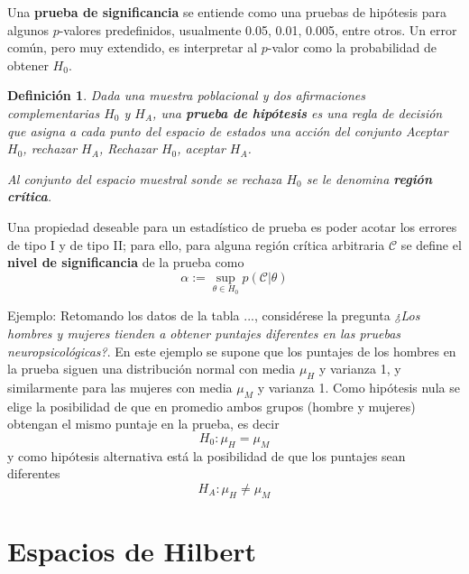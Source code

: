 \documentclass[12pt,letterpaper,draft]{book}
\newtheorem{definicion}{Definición}[chapter]
\begin{document}
Una \textbf{prueba de significancia} se entiende como una pruebas de hipótesis para algunos $p$-valores predefinidos, usualmente 0.05, 0.01, 0.005, entre otros.
%
Un error común, pero muy extendido, es interpretar al $p$-valor como la probabilidad de obtener $H_0$.

\begin{definicion}
Dada una muestra poblacional y dos afirmaciones complementarias $H_0$ y $H_A$, una \textbf{prueba de hipótesis} es una regla de decisión que asigna a cada punto del espacio de estados una acción del conjunto Aceptar $H_0$, rechazar $H_A$, Rechazar $H_0$, aceptar $H_A$.

Al conjunto del espacio muestral sonde se rechaza $H_0$ se le denomina \textbf{región crítica}. 
\end{definicion}

Una propiedad deseable para un estadístico de prueba es poder acotar los errores de tipo I y de tipo II; para ello, para alguna región crítica arbitraria $\mathcal{C}$ se define el \textbf{nivel de significancia} de la prueba como
\begin{equation}
\alpha := \sup_{\theta \in H_0} p(\mathcal{C} \lvert \theta)
\end{equation}

Ejemplo:
Retomando los datos de la tabla ..., considérese la pregunta \textit{¿Los hombres y mujeres tienden
a obtener puntajes diferentes en las pruebas neuropsicológicas?}. 
%
En este ejemplo se supone que los puntajes de los hombres en la prueba siguen una distribución normal con media $\mu_H$ y varianza 1, y similarmente para las mujeres con media $\mu_M$ y varianza 1.
%
Como hipótesis nula se elige la posibilidad de que en promedio ambos grupos (hombre y mujeres) obtengan el mismo puntaje en la prueba, es decir
\begin{equation}
H_0 : \mu_H = \mu_M
\end{equation}
y como hipótesis alternativa está la posibilidad de que los puntajes sean diferentes
\begin{equation}
H_A : \mu_H \neq \mu_M
\end{equation}


\section{Espacios de Hilbert}
\end{document}
